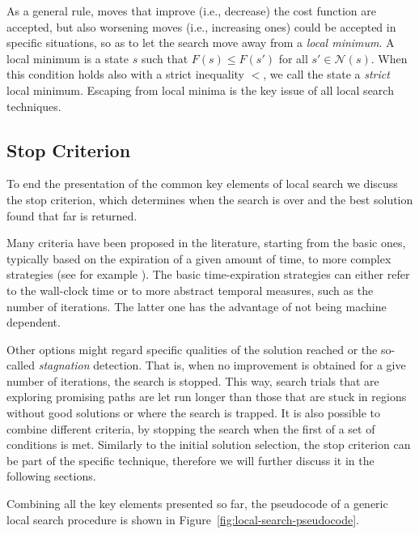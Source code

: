 As a general rule, moves that improve (i.e., decrease) the cost function are
accepted, but also worsening moves (i.e., increasing ones) could be accepted in specific
situations, so as to let the search move away from a \emph{local minimum}.
A local minimum is a state $s$ such that $F(s) \leq F(s')$ for all $s'
\in \mathcal{N}(s)$. When this condition holds also with a strict inequality $<$, 
we call the state a \emph{strict} local minimum. Escaping from local minima is the key issue of all local search techniques.

\subsection{Stop Criterion}\label{sec:stop-criteria}

To end the presentation of the common key elements of local search
we discuss the stop criterion, which determines when the search
is over and the best solution found that far is returned.

Many criteria have been proposed in the literature, starting from the
basic ones, typically based on the expiration of a given amount of time, 
to more complex strategies (see for example \cite[Sect.~3.2]{FrSt19}).
The basic time-expiration strategies can either refer to the wall-clock time or to more
abstract temporal measures, such as the number of iterations. The latter one has the 
advantage of not being machine dependent.

Other options might regard specific qualities of the solution reached
or the so-called \emph{stagnation} detection. That is, when no
improvement is obtained for a give number of iterations, the search is
stopped.  This way, search trials that are exploring promising paths
are let run longer than those that are stuck in regions without good
solutions or where the search is trapped.  It is also possible to
combine different criteria, by stopping the search when the first of a
set of conditions is met.  Similarly to the initial solution
selection, the stop criterion can be part of the specific technique,
therefore we will further discuss it in the following sections.
\vspace{\parskip}

Combining all the key elements presented so far, the pseudocode of a generic local search procedure is shown in
Figure~\ref{fig:local-search-pseudocode}.

